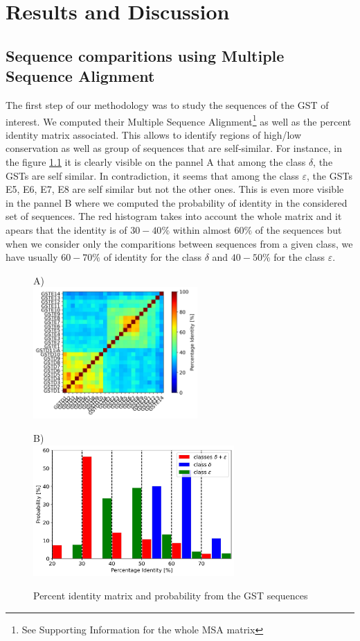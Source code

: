 \chapter{Results and Discussion}

\section{Sequence comparitions using Multiple Sequence Alignment}
\noindent The first step of our methodology was to study the sequences of the GST of interest. We computed their Multiple Sequence Alignment\footnote{See Supporting Information for the whole MSA matrix} as well as the percent identity matrix associated. This allows to identify regions of high/low conservation as well as group of sequences that are self-similar. For instance, in the figure \ref{Sequence and Structure matricies} it is clearly visible on the pannel A that among the class $\delta$, the GSTs are self similar. In contradiction, it seems that among the class $\varepsilon$, the GSTs E5, E6, E7, E8 are self similar but not the other ones. This is even more visible in the pannel B where we computed the probability  of identity in the considered set of sequences. The red histogram takes into account the whole matrix and it apears that the identity is of $30-40\%$ within almost $60\%$ of the sequences but when we consider only the comparitions between sequences from a given class, we have usually $60-70\%$ of identity for the class $\delta$ and $40-50\%$ for the class $\varepsilon$. 

\begin{figure}[H]
	\label{Sequence and Structure matricies}
	\begin{minipage}{.48\linewidth}
		A)\\
		\includegraphics[height = 5cm]{figures/PercentID_matrix.jpg}
	\end{minipage}
	\begin{minipage}{.48\linewidth}
		B)\\
		\includegraphics[height = 5cm]{figures/PercentID_proba.jpg}
	\end{minipage}
	\caption{Percent identity matrix and probability from the GST sequences}
\end{figure}

